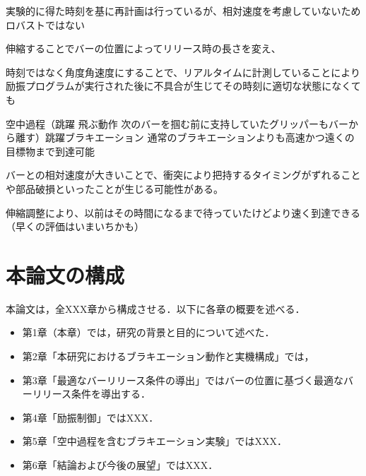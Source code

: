           実験的に得た時刻を基に再計画は行っているが、相対速度を考慮していないためロバストではない

          伸縮することでバーの位置によってリリース時の長さを変え、

          時刻ではなく角度角速度にすることで、リアルタイムに計測していることにより励振プログラムが実行された後に不具合が生じてその時刻に適切な状態になくても

          空中過程（跳躍 飛ぶ動作 次のバーを掴む前に支持していたグリッパーもバーから離す）跳躍ブラキエーション
          通常のブラキエーションよりも高速かつ遠くの目標物まで到達可能
          
          バーとの相対速度が大きいことで、衝突により把持するタイミングがずれることや部品破損といったことが生じる可能性がある。

          伸縮調整により、以前はその時間になるまで待っていたけどより速く到達できる（早くの評価はいまいちかも）


        \section{本論文の構成}

          本論文は，全XXX章から構成させる．以下に各章の概要を述べる．
          \begin{itemize}
            \item 第1章（本章）では，研究の背景と目的について述べた．
            \item 第2章「本研究におけるブラキエーション動作と実機構成」では，
            \item 第3章「最適なバーリリース条件の導出」ではバーの位置に基づく最適なバーリリース条件を導出する．
            \item 第4章「励振制御」ではXXX．
            \item 第5章「空中過程を含むブラキエーション実験」ではXXX．
            \item 第6章「結論および今後の展望」ではXXX．
          \end{itemize}

